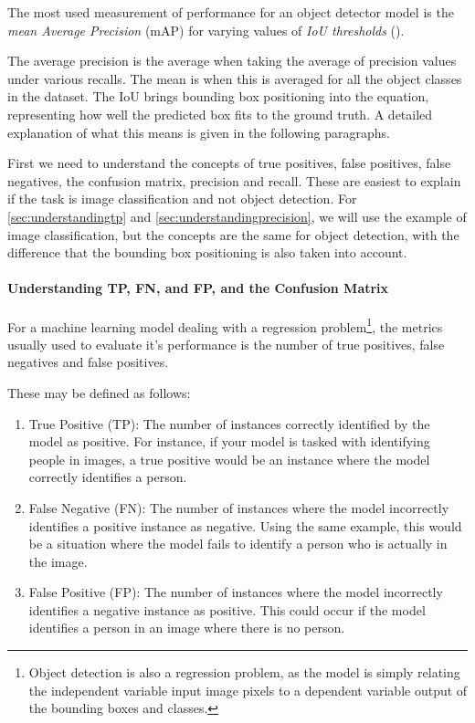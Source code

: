 The most used measurement of performance for an object detector model is the \textit{mean Average Precision} (mAP) for varying values of \textit{IoU thresholds} (\cite{zou2023object_detection_in_20_years}). 

The average precision is the average when taking the average of precision values under various recalls. The mean is when this is averaged for all the object classes in the dataset. The IoU brings bounding box positioning into the equation, representing how well the predicted box fits to the ground truth. A detailed explanation of what this means is given in the following paragraphs.

First we need to understand the concepts of true positives, false positives, false negatives, the confusion matrix, precision and recall. These are easiest to explain if the task is image classification and not object detection. For \ref{sec:understandingtp} and \ref{sec:understandingprecision}, we will use the example of image classification, but the concepts are the same for object detection, with the difference that the bounding box positioning is also taken into account.

\paragraph{Understanding TP, FN, and FP, and the Confusion Matrix}
\label{sec:understandingtp}
For a machine learning model dealing with a regression problem\footnote{Object detection is also a regression problem, as the model is simply relating the independent variable input image pixels to a dependent variable output of the bounding boxes and classes.}, the metrics usually used to evaluate it's performance is the number of true positives, false negatives and false positives. 

These may be defined as follows:
\begin{enumerate}
    \item True Positive (TP): The number of instances correctly identified by the model as positive. For instance, if your model is tasked with identifying people in images, a true positive would be an instance where the model correctly identifies a person.
    \item False Negative (FN): The number of instances where the model incorrectly identifies a positive instance as negative. Using the same example, this would be a situation where the model fails to identify a person who is actually in the image.
    \item False Positive (FP): The number of instances where the model incorrectly identifies a negative instance as positive. This could occur if the model identifies a person in an image where there is no person.
\end{enumerate}

